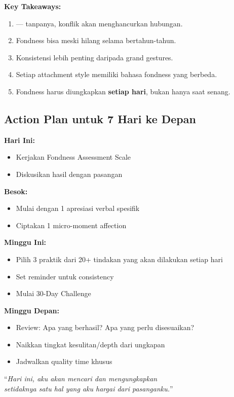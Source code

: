 \begin{insightbox}
\textbf{Key Takeaways:}
\begin{enumerate}
    \item {} --- tanpanya, konflik akan menghancurkan hubungan.
    \item Fondness bisa  meski hilang selama bertahun-tahun.
    \item Konsistensi lebih penting daripada grand gestures.
    \item Setiap attachment style memiliki bahasa fondness yang berbeda.
    \item Fondness harus diungkapkan \textbf{setiap hari}, bukan hanya saat senang.
\end{enumerate}
\end{insightbox}

\subsection{Action Plan untuk 7 Hari ke Depan}

\begin{exercisebox}
\textbf{Hari Ini:}
\begin{itemize}
    \item Kerjakan Fondness Assessment Scale
    \item Diskusikan hasil dengan pasangan
\end{itemize}

\textbf{Besok:}
\begin{itemize}
    \item Mulai dengan 1 apresiasi verbal spesifik
    \item Ciptakan 1 micro-moment affection
\end{itemize}

\textbf{Minggu Ini:}
\begin{itemize}
    \item Pilih 3 praktik dari 20+ tindakan yang akan dilakukan setiap hari
    \item Set reminder untuk consistency
    \item Mulai 30-Day Challenge
\end{itemize}

\textbf{Minggu Depan:}
\begin{itemize}
    \item Review: Apa yang berhasil? Apa yang perlu disesuaikan?
    \item Naikkan tingkat kesulitan/depth dari ungkapan
    \item Jadwalkan quality time khusus
\end{itemize}
\end{exercisebox}

\begin{tipbox}
\begin{center}
\Large
``\textit{Hari ini, aku akan mencari dan mengungkapkan\\
setidaknya satu hal yang aku hargai dari pasanganku.}''
\end{center}
\end{tipbox}
